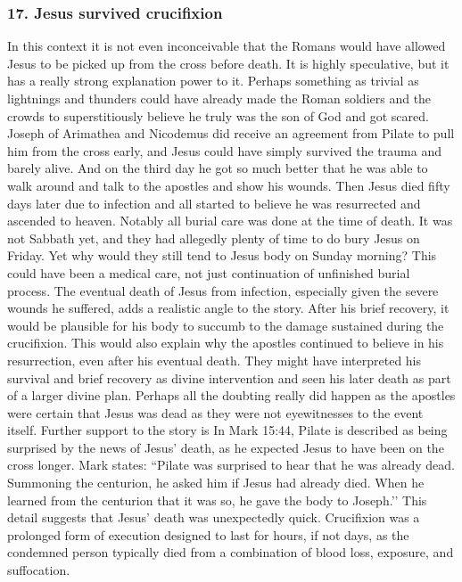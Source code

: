 \subsubsection{17.
Jesus survived crucifixion}\label{subsubsec:jesus-survived-crucifixion}
In this context it is not even inconceivable that the Romans would have allowed Jesus to be picked up from the cross before death.
It is highly speculative, but it has a really strong explanation power to it.
Perhaps something as trivial as lightnings and thunders could have already made the Roman soldiers and the crowds to superstitiously believe he truly was the son of God and got scared.
Joseph of Arimathea and Nicodemus did receive an agreement from Pilate to pull him from the cross early, and Jesus could have simply survived the trauma and barely alive.
And on the third day he got so much better that he was able to walk around and talk to the apostles and show his wounds.
Then Jesus died fifty days later due to infection and all started to believe he was resurrected and ascended to heaven.
Notably all burial care was done at the time of death.
It was not Sabbath yet, and they had allegedly plenty of time to do bury Jesus on Friday.
Yet why would they still tend to Jesus body on Sunday morning?
This could have been a medical care, not just continuation of unfinished burial process.
The eventual death of Jesus from infection, especially given the severe wounds he suffered, adds a realistic angle to the story.
After his brief recovery, it would be plausible for his body to succumb to the damage sustained during the crucifixion.
This would also explain why the apostles continued to believe in his resurrection, even after his eventual death.
They might have interpreted his survival and brief recovery as divine intervention and seen his later death as part of a larger divine plan.
Perhaps all the doubting really did happen as the apostles were certain that Jesus was dead as they were not eyewitnesses to the event itself.
Further support to the story is In Mark 15:44, Pilate is described as being surprised by the news of Jesus’ death, as he expected Jesus to have been on the cross longer.
Mark states: ``Pilate was surprised to hear that he was already dead.
Summoning the centurion, he asked him if Jesus had already died.
When he learned from the centurion that it was so, he gave the body to Joseph.’’ This detail suggests that Jesus’ death was unexpectedly quick.
Crucifixion was a prolonged form of execution designed to last for hours, if not days, as the condemned person typically died from a combination of blood loss, exposure, and suffocation.
